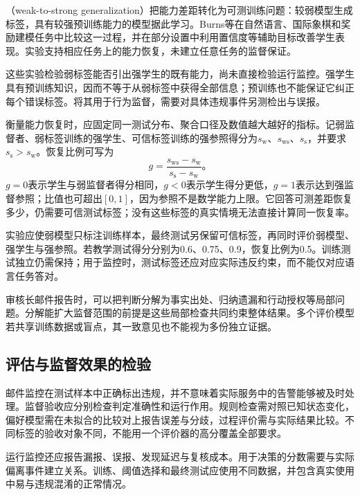 （weak-to-strong generalization）把能力差距转化为可测训练问题：较弱模型生成标签，具有较强预训练能力的模型据此学习。Burns等在自然语言、国际象棋和奖励建模任务中比较这一过程，并在部分设置中利用置信度等辅助目标改善学生表现。实验支持相应任务上的能力恢复，未建立任意任务的监督保证。

这些实验检验弱标签能否引出强学生的既有能力，尚未直接检验运行监控。强学生具有预训练知识，因而不等于从弱标签中获得全部信息；预训练也不能保证它纠正每个错误标签。将其用于行为监督，需要对具体违规事件另测检出与误报。

衡量能力恢复时，应固定同一测试分布、聚合口径及数值越大越好的指标。记弱监督者、弱标签训练的强学生、可信标签训练的强参照得分为$s_{\mathrm w}$、$s_{\mathrm{ws}}$、$s_{\mathrm s}$，并要求$s_{\mathrm s}>s_{\mathrm w}$。恢复比例可写为
\begin{equation}
 g=\frac{s_{\mathrm{ws}}-s_{\mathrm{w}}}
          {s_{\mathrm{s}}-s_{\mathrm{w}}}\text{。}
 \label{eq:alignment-weak-strong-recovery}
\end{equation}
$g=0$表示学生与弱监督者得分相同，$g<0$表示学生得分更低，$g=1$表示达到强监督参照；比值也可超出$[0,1]$，因为参照不是数学能力上限。它回答可测差距恢复多少，仍需要可信测试标签；没有这些标签的真实情境无法直接计算同一恢复率。

实验应使弱模型只标注训练样本，最终测试另保留可信标签，再同时评价弱模型、强学生与强参照。若教学测试得分分别为0.6、0.75、0.9，恢复比例为0.5。训练测试独立仍需保持；用于监控时，测试标签还应对应实际违反约束，而不能仅对应语言任务答对。

审核长邮件报告时，可以把判断分解为事实出处、归纳遗漏和行动授权等局部问题。分解能扩大监督范围的前提是这些局部检查共同约束整体结果。多个评价模型若共享训练数据或盲点，其一致意见也不能视为多份独立证据。

\subsection{评估与监督效果的检验}
\label{sec:alignment-oversight-validation}

邮件监控在测试样本中正确标出违规，并不意味着实际服务中的告警能够被及时处理。监督验收应分别检查判定准确性和运行作用。规则检查需对照已知状态变化，偏好模型需在未拟合的比较对上报告误差与分歧，过程评价需与实际结果比较。不同标签的验收对象不同，不能用一个评价器的高分覆盖全部要求。

运行监控还应报告漏报、误报、发现延迟与复核成本。用于决策的分数需要与实际偏离事件建立关系。训练、阈值选择和最终测试应使用不同数据，并包含真实使用中易与违规混淆的正常情况。

